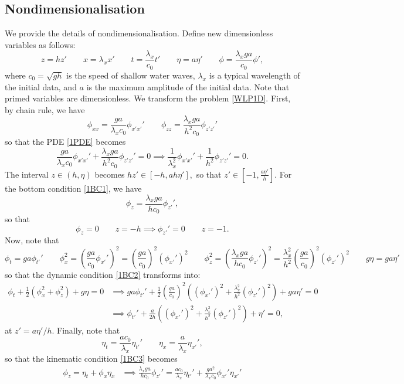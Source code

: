 \documentclass[10pt,reqno,oneside,a4paper]{article}
\begin{document}
\begin{appendices}
\subsection*{Nondimensionalisation}
We provide the details of nondimensionalisation. Define new dimensionless variables as follows:
\[ 
z = h z' \qquad x = \lambda_x x' \qquad t = \frac{\lambda_x}{c_0} t' \qquad \eta = a \eta' \qquad \phi  = \frac{\lambda_x ga}{c_0} \phi',
\]
where $c_0 = \sqrt{gh}$ is the speed of shallow water waves, $\lambda_x$ is a typical wavelength of the initial data, and $a$ is the maximum amplitude of the initial data. Note that primed variables are dimensionless. We transform the problem \eqref{WLP1D}.
First, by chain rule, we have
\[ 
\phi_{xx} = \frac{ga}{\lambda_x c_0} \phi_{x'x'}' \qquad \phi_{zz} = \frac{\lambda_x ga}{h^2c_0} \phi_{z'z'}'\] 
so that the PDE \eqref{1PDE} becomes
\[\frac{ga}{\lambda_x c_0} \phi_{x'x'}' + \frac{\lambda_x ga}{h^2c_0} \phi_{z'z'}' = 0 \implies \frac{1}{\lambda_x^2} \phi_{x'x'}' + \frac{1}{h^2} \phi_{z'z'}' = 0.
\]
The interval $z \in (h, \eta)$ becomes $hz' \in [-h, a h \eta'],$ so that $z' \in [-1, \frac{a \eta'}{h}].$ For the bottom condition \eqref{1BC1}, we have
\[ 
\phi_z =  \frac{\lambda_x ga}{h c_0} \phi_{z'}',
\]
so that 
\[ \phi_z = 0 \qquad z = - h \implies \phi_{z'}' = 0 \qquad z = -1. \]
Now, note that 
\[ 
\phi_t = ga \phi_{t'}' \qquad \phi_x^2 = \left(\frac{ga}{c_0} \phi_{x'}'\right)^2 = \left(\frac{ga}{c_0}\right)^2 \left(\phi_{x'}'\right)^2 \qquad \phi_z^2 = \left(\frac{\lambda_x ga}{hc_0}\phi_{z'}'\right)^2 = \frac{\lambda_x^2}{h^2}\left(\frac{ga}{c_0}\right)^2\left(\phi_{z'}'\right)^2 \qquad g\eta = ga\eta'
\]
so that the dynamic condition \eqref{1BC2} transforms into:
\begin{align*}
\phi_t + \frac{1}{2} (\phi_{x}^2 + \phi_{z}^2) + g \eta = 0 &\implies ga \phi_{t'}' + \frac{1}{2}\left(\frac{ga}{c_0}\right)^2 \left((\phi_{x'}')^2 + \frac{\lambda_x^2}{h^2}(\phi_{z'}')^2\right) + ga \eta' = 0 \\
&\implies \phi_{t'}' + \frac{a}{2h} \left((\phi_{x'}')^2 + \frac{\lambda_x^2}{h^2}(\phi_{z'}')^2\right) + \eta' = 0,
\end{align*}
at $z' = a\eta'/h.$ Finally, note that 
\[ 
\eta_t = \frac{ac_0}{\lambda_x}\eta_{t'}' \qquad \eta_x = \frac{a}{\lambda_x}\eta_{x'}',
\]
so that the kinematic condition \eqref{1BC3} becomes
\begin{align*}
\phi_z = \eta_t + \phi_x\eta_x &\implies \frac{\lambda_x ga}{h c_0} \phi_{z'}'=\frac{ac_0}{\lambda_x}\eta_{t'}' + \frac{ga^2}{\lambda_xc_0} \phi_{x'}' \eta_{x'}' \\

\end{align*}
\end{appendices}
\end{document}

